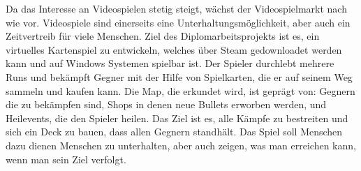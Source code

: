 %
Da das Interesse an Videospielen stetig steigt, wächst der Videospielmarkt nach wie vor. Videospiele sind einerseits eine Unterhaltungsmöglichkeit, aber auch ein Zeitvertreib für viele Menschen.
Ziel des Diplomarbeitsprojekts ist es, ein virtuelles Kartenspiel zu entwickeln, welches über Steam gedownloadet werden kann und auf Windows Systemen spielbar ist. Der Spieler durchlebt mehrere Runs und bekämpft Gegner mit der Hilfe von Spielkarten, die er auf seinem Weg sammeln und kaufen kann. Die Map, die erkundet wird, ist geprägt von: Gegnern die zu bekämpfen sind, Shops in denen neue Bullets erworben werden, und Heilevents, die den Spieler heilen. Das Ziel ist es, alle Kämpfe zu bestreiten und sich ein Deck zu bauen, dass allen Gegnern standhält.
Das Spiel soll Menschen dazu dienen Menschen zu unterhalten, aber auch zeigen, was man erreichen kann, wenn man sein Ziel verfolgt.
%
